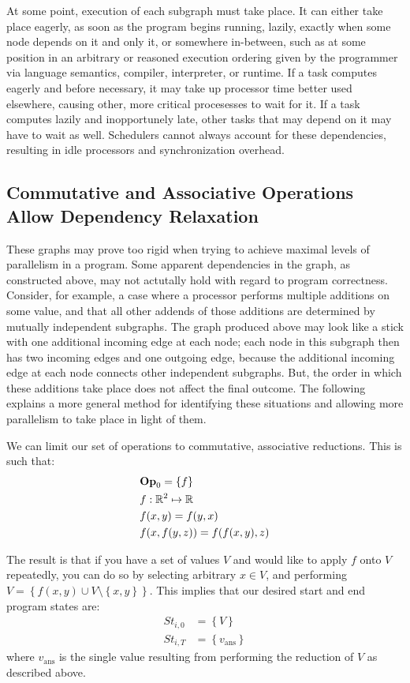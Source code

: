 At some point, execution of each subgraph must take place. It can either take
place eagerly, as soon as the program begins running, lazily, exactly when some
node depends on it and only it, or somewhere in-between, such as at some
position in an arbitrary or reasoned execution ordering given by the programmer
via language semantics, compiler, interpreter, or runtime. If a task computes
eagerly and before necessary, it may take up processor time better used
elsewhere, causing other, more critical procesesses to wait for it. If a task
computes lazily and inopportunely late, other tasks that may depend on it may
have to wait as well. Schedulers cannot always account for these dependencies,
resulting in idle processors and synchronization overhead.

\subsection{Commutative and Associative Operations Allow Dependency Relaxation}
These graphs may prove too rigid when trying to achieve maximal levels of
parallelism in a program. Some apparent dependencies in the graph, as
constructed above, may not actutally hold with regard to program correctness.
Consider, for example, a case where a processor performs multiple additions on
some value, and that all other addends of those additions are determined by
mutually independent subgraphs. The graph produced above may look like a stick
with one additional incoming edge at each node; each node in this subgraph then
has two incoming edges and one outgoing edge, because the additional incoming
edge at each node connects other independent subgraphs. But, the order in which
these additions take place does not affect the final outcome. The following
explains a more general method for identifying these situations and allowing
more parallelism to take place in light of them.

We can limit our set of operations to commutative, associative reductions.
This is such that:
\begin{align}
    & \mathrm{\mathbf{Op}}_0 = \left\{f\right\}  \\
    & f: \mathbb{R}^2 \mapsto \mathbb{R}  \\
    & f(x,y) = f(y,x)  \\
    & f(x,f(y,z)) = f(f(x,y),z) 
\end{align}

The result is that if you have a set of values $V$ and would like to apply $f$
onto $V$ repeatedly, you can do so by selecting arbitrary $x \in V$, and
performing $V = \left\{ f(x,y) \cup V \setminus \left\{ x, y \right\}
\right\}$.  This implies that our desired start and end program states are:
\begin{align*}
    St_{i,0} &= \left\{ V \right\}  \\
    St_{i,T} &= \left\{ v_\text{ans} \right\}
\end{align*}
where $v_\text{ans}$ is the single value resulting from performing the reduction
of $V$ as described above.

